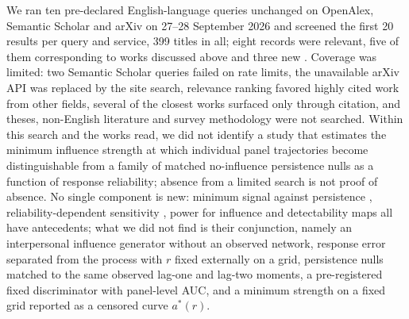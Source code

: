 We ran ten pre-declared English-language queries unchanged on OpenAlex, Semantic Scholar and arXiv on 27--28 September 2026 and screened the first 20 results per query and service, 399 titles in all; eight records were relevant, five of them corresponding to works discussed above and three new \cite{carpentras2022,xu2021sensitivity,advani2018credibly}.
Coverage was limited: two Semantic Scholar queries failed on rate limits, the unavailable arXiv API was replaced by the site search, relevance ranking favored highly cited work from other fields, several of the closest works surfaced only through citation, and theses, non-English literature and survey methodology were not searched.
Within this search and the works read, we did not identify a study that estimates the minimum influence strength at which individual panel trajectories become distinguishable from a family of matched no-influence persistence nulls as a function of response reliability; absence from a limited search is not proof of absence.
No single component is new: minimum signal against persistence \cite{moor2026,coding2024}, reliability-dependent sensitivity \cite{mulder2023,dang2026}, power for influence \cite{stadtfeld2020} and detectability maps \cite{urena2026} all have antecedents; what we did not find is their conjunction, namely an interpersonal influence generator without an observed network, response error separated from the process with $r$ fixed externally on a grid, persistence nulls matched to the same observed lag-one and lag-two moments, a pre-registered fixed discriminator with panel-level AUC, and a minimum strength on a fixed grid reported as a censored curve $a^*(r)$.
